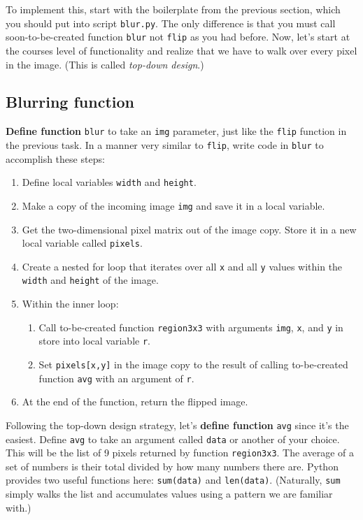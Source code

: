 \documentclass[titlepage]{tufte-book}
\newcounter{total}
\begin{document}
To implement this, start with the boilerplate from the previous section, which you should put into script {\tt blur.py}. The only difference is that you must call soon-to-be-created function {\tt blur} not {\tt flip} as you had before. Now, let's start at the courses level of functionality and realize that we have to walk over every pixel in the image. (This is called {\em top-down design}.) 

\subsection{Blurring function}

{\bf Define function} {\tt blur} to take an {\tt img} parameter, just like the {\tt flip} function in the previous task.  In a manner very similar to {\tt flip}, write code in {\tt blur} to accomplish these steps:

\begin{enumerate}

\item Define local variables {\tt width} and {\tt height}.
\item Make a copy of the incoming image {\tt img} and save it in a local variable.
\item Get the two-dimensional pixel matrix out of the image copy. Store it in a new local variable called {\tt pixels}.
\item Create a nested for loop that iterates over all {\tt x} and all {\tt y} values within the {\tt width} and {\tt height} of the image.
\item Within the inner loop:
\begin{enumerate}
\item Call to-be-created function {\tt region3x3} with arguments {\tt img}, {\tt x}, and {\tt y} in store into local variable {\tt r}.
\item Set {\tt pixels[x,y]} in the image copy to the result of calling to-be-created function {\tt avg} with an argument of {\tt r}.
\end{enumerate}
\item At the end of the function, return the flipped image.
\end{enumerate} 

Following the top-down design strategy, let's {\bf define function} {\tt avg} since it's the easiest. Define {\tt avg} to take an argument called {\tt data} or another of your choice. This will be the list of 9 pixels returned by function {\tt region3x3}. The average of a set of numbers is their total divided by how many numbers there are. Python provides two useful functions here: {\tt sum(data)} and {\tt len(data)}.  (Naturally, {\tt sum} simply walks the list and accumulates values using a pattern we are familiar with.)
\end{document}
